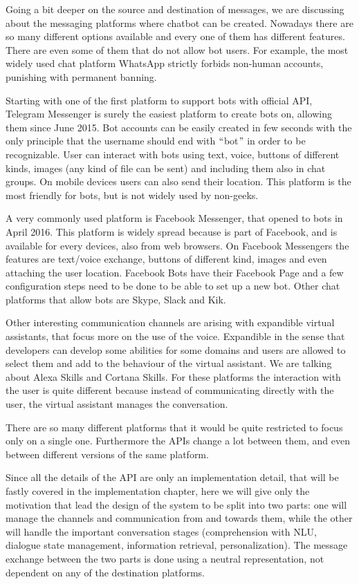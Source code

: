 Going a bit deeper on the source and destination of messages, we are discussing about the messaging platforms where chatbot can be created. Nowadays there are so many different options available and every one of them has different features. There are even some of them that do not allow bot users. For example, the most widely used chat platform WhatsApp strictly forbids non-human accounts, punishing with permanent banning.

Starting with one of the first platform to support bots with official API, Telegram Messenger is surely the easiest platform to create bots on, allowing them since June 2015. Bot accounts can be easily created in few seconds with the only principle that the username should end with $``$bot$"$  in order to be recognizable. User can interact with bots using text, voice, buttons of different kinds, images (any kind of file can be sent) and including them also in chat groups. On mobile devices users can also send their location. This platform is the most friendly for bots, but is not widely used by non-geeks.

A very commonly used platform is Facebook Messenger, that opened to bots in April 2016. This platform is widely spread because is part of Facebook, and is available for every devices, also from web browsers. On Facebook Messengers the features are text/voice exchange, buttons of different kind, images and even attaching the user location. Facebook Bots have their Facebook Page and a few configuration steps need to be done to be able to set up a new bot. Other chat platforms that allow bots are Skype, Slack and Kik.

Other interesting communication channels are arising with expandible virtual assistants, that focus more on the use of the voice. Expandible in the sense that developers can develop some abilities for some domains and users are allowed to select them and add to the behaviour of the virtual assistant. We are talking about Alexa Skills and Cortana Skills. For these platforms the interaction with the user is quite different because instead of communicating directly with the user, the virtual assistant manages the conversation.

There are so many different platforms that it would be quite restricted to focus only on a single one. Furthermore the APIs change a lot between them, and even between different versions of the same platform.

Since all the details of the API are only an implementation detail, that will be fastly covered in the implementation chapter, here we will give only the motivation that lead the design of the system to be split into two parts: one will manage the channels and communication from and towards them, while the other will handle the important conversation stages (comprehension with NLU, dialogue state management, information retrieval, personalization). The message exchange between the two parts is done using a neutral representation, not dependent on any of the destination platforms.

